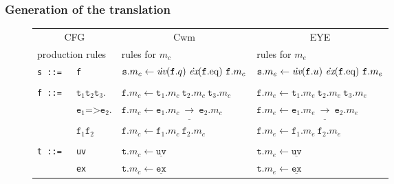 \subsubsection{Generation of the translation}\label{all}
\begin{figure*}
\begin{minipage}{0.95\textwidth}
\begin{center}%
 \begin{tabular}{llll}
\hline
\multicolumn{2}{c}{CFG}& \multicolumn{1}{c}{Cwm} &\multicolumn{1}{c}{EYE}\\
\multicolumn{2}{l}{production rules}& \multicolumn{1}{l}{rules for $m_c$}&  \multicolumn{1}{l}{rules for $m_e$} \\
  \hline
\texttt{s ::=}&\texttt{f}& $ \texttt{s}.m_c \leftarrow   \dot{\operatorname{\textit{uv}}}(\texttt{f}.q)\  \dot{\operatorname{\textit{ex}}}(\texttt{f}.\eq)\ \texttt{f}.m_c $& $ \texttt{s}.m_e \leftarrow   \dot{\operatorname{\textit{uv}}}(\texttt{f}.u)\  \dot{\operatorname{\textit{ex}}}(\texttt{f}.\eq)\ \texttt{f}.m_e $\\
       &&&\\
\texttt{f ::= } &  $ \texttt{t}_1 \texttt{t}_2 \texttt{t}_3.$&   $ \texttt{f}.m_c \leftarrow \texttt{t}_1.m_c\ \texttt{t}_2.m_c\ \texttt{t}_3.m_c$ &  $ \texttt{f}.m_e \leftarrow \texttt{t}_1.m_e\ \texttt{t}_2.m_e\ \texttt{t}_3.m_e$ \\
    &  $\texttt{e}_1 \texttt{=>}  \texttt{e}_2.$& $\texttt{f}.m_c \leftarrow \texttt{e}_1.m_c\ \underline{\rightarrow}\ \texttt{e}_2.m_c$ & $\texttt{f}.m_e \leftarrow \texttt{e}_1.m_e\ \underline{\rightarrow}\ \texttt{e}_2.m_e$\\
    & $ \texttt{f}_1 \texttt{f}_2$ &                $\texttt{f}.m_c \leftarrow \texttt{f}_1.m_c\ \texttt{f}_2.m_c$ &  $\texttt{f}.m_e \leftarrow \texttt{f}_1.m_e\ \texttt{f}_2.m_e$ \\
&&&\\
\texttt{t ::=}& \texttt{uv}\hspace{0.07\textwidth} &                $\texttt{t}.m_c \leftarrow\underline{\texttt{uv}}$ &   $\texttt{t}.m_e \leftarrow\underline{\texttt{uv}}$ \\
            & \texttt{ex} &               $\texttt{t}.m_c \leftarrow \underline{\texttt{ex}}$&   $\texttt{t}.m_e \leftarrow \underline{\texttt{ex}}$\\

\end{tabular}
\end{center}
\end{minipage}
\end{figure*}
